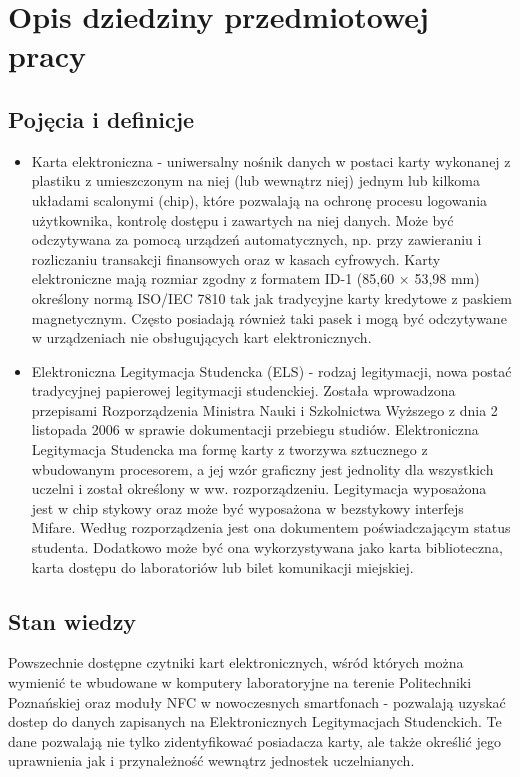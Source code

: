 % 
\newpage\section{Opis dziedziny przedmiotowej pracy}\label{sec:dziedzina}


\subsection{Pojęcia i definicje}
\begin{itemize}
  \item Karta elektroniczna - uniwersalny nośnik danych w postaci karty wykonanej z plastiku z umieszczonym na niej (lub wewnątrz niej) jednym lub kilkoma układami scalonymi (chip), które pozwalają na ochronę procesu logowania użytkownika, kontrolę dostępu i zawartych na niej danych. Może być odczytywana za pomocą urządzeń automatycznych, np. przy zawieraniu i rozliczaniu transakcji finansowych oraz w kasach cyfrowych. Karty elektroniczne mają rozmiar zgodny z formatem ID-1 (85,60 × 53,98 mm) określony normą ISO/IEC 7810 tak jak tradycyjne karty kredytowe z paskiem magnetycznym. Często posiadają również taki pasek i mogą być odczytywane w urządzeniach nie obsługujących kart elektronicznych.
  \item Elektroniczna Legitymacja Studencka (ELS) - rodzaj legitymacji, nowa postać tradycyjnej papierowej legitymacji studenckiej. Została wprowadzona przepisami Rozporządzenia Ministra Nauki i Szkolnictwa Wyższego z dnia 2 listopada 2006 w sprawie dokumentacji przebiegu studiów. Elektroniczna Legitymacja Studencka ma formę karty z tworzywa sztucznego z wbudowanym procesorem, a jej wzór graficzny jest jednolity dla wszystkich uczelni i został określony w ww. rozporządzeniu. Legitymacja wyposażona jest w chip stykowy oraz może być wyposażona w bezstykowy interfejs Mifare. Według rozporządzenia jest ona dokumentem poświadczającym status studenta. Dodatkowo może być ona wykorzystywana jako karta biblioteczna, karta dostępu do laboratoriów lub bilet komunikacji miejskiej.
\end{itemize}
\subsection{Stan wiedzy}
Powszechnie dostępne czytniki kart elektronicznych, wśród których można wymienić te wbudowane w komputery laboratoryjne na terenie Politechniki Poznańskiej oraz moduły NFC w nowoczesnych smartfonach - pozwalają uzyskać dostep do danych zapisanych na Elektronicznych Legitymacjach Studenckich. Te dane pozwalają nie tylko zidentyfikować posiadacza karty, ale także określić jego uprawnienia jak i przynależność wewnątrz jednostek uczelnianych.

